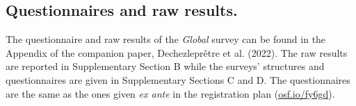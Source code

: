 \begin{small}
\subsection*{\small Questionnaires and raw results.} %
The questionnaire and raw results of the \textit{Global} survey can be found in the Appendix of the companion paper, Dechezleprêtre et al. (2022).\cite{dechezlepretre_fighting_2022} %
The raw results are reported in Supplementary Section B %
while the surveys' structures and questionnaires are given in Supplementary Sections C and D. The questionnaires are the same as the ones given \textit{ex ante} in the registration plan (\href{https://osf.io/fy6gd}{osf.io/fy6gd}).



\end{small}
